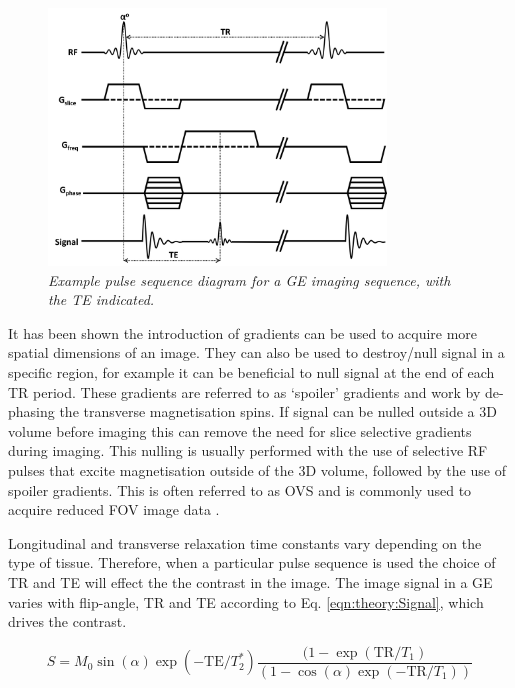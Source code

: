 \begin{figure}
    \centering
    \includegraphics[width=0.8\textwidth]{Figures/Theory/GRE_sequence.png}
    \caption{\textit{Example pulse sequence diagram for a \ac{GE} imaging sequence, with the \ac{TE} indicated.}}
    \label{fig:theory:GRE}
\end{figure}

It has been shown the introduction of gradients can be used to acquire more spatial dimensions of an image. They can also be used to destroy/null signal in a specific region, for example it can be beneficial to null signal at the end of each \ac{TR} period. These gradients are referred to as `spoiler' gradients and work by de-phasing the transverse magnetisation spins. If signal can be nulled outside a 3D volume before imaging this can remove the need for slice selective gradients during imaging. This nulling is usually performed with the use of selective \ac{RF} pulses that excite magnetisation outside of the 3D volume, followed by the use of spoiler gradients. This is often referred to as \ac{OVS} and is commonly used to acquire reduced \ac{FOV} image data \cite{Smith2012ReducedSuppression}.

Longitudinal and transverse relaxation time constants vary depending on the type of tissue. Therefore, when a particular pulse sequence is used the choice of \ac{TR} and \ac{TE} will effect the the contrast in the image. The image signal in a \ac{GE} varies with flip-angle, \ac{TR} and \ac{TE} according to Eq. \ref{eqn:theory:Signal}, which drives the contrast.

\begin{equation}
    S = M_0\sin(\alpha)\exp(-\textrm{TE}/T_2^*)\frac{(1-\exp(\textrm{TR}/T_1)}{(1-\cos(\alpha)\exp(-\textrm{TR}/T_1))}
    \label{eqn:theory:Signal}
\end{equation}

